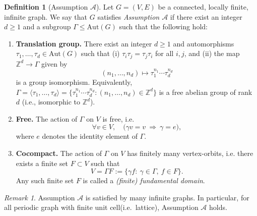 \documentclass[a4paper,11pt]{article}
\theoremstyle{plain}
\theoremstyle{definition}
\newtheorem{definition}[theorem]{Definition}
\theoremstyle{remark}
\newtheorem{remark}[theorem]{Remark}
\newcommand{\1}{\mathbf{1}}
\begin{document}
\begin{definition}[Assumption $\mathcal{A}$]\label{def:assumptionA}
Let $G=(V,E)$ be a connected, locally finite, infinite graph.
We say that $G$ satisfies \emph{Assumption $\mathcal{A}$} if there exist an integer $d\ge 1$
and a subgroup $\Gamma\le \mathrm{Aut}(G)$ such that the following hold:

\begin{enumerate}

\item \textbf{Translation group.}
There exist an integer $d\ge 1$ and automorphisms $\tau_1,\dots,\tau_d\in \mathrm{Aut}(G)$ such that
(i) $\tau_i\tau_j=\tau_j\tau_i$ for all $i,j$, and
(ii) the map $\mathbb{Z}^d\to\Gamma$ given by
\[
(n_1,\dots,n_d)\longmapsto \tau_1^{n_1}\cdots \tau_d^{n_d}
\]
is a group isomorphism. Equivalently, $\Gamma=\langle\tau_1,\dots,\tau_d\rangle=\{\tau_1^{n_1}\cdots\tau_d^{n_d}:(n_1,\dots,n_d)\in\mathbb{Z}^d\}$ is a free abelian group of rank $d$
(i.e., isomorphic to $\mathbb{Z}^d$).


\item \textbf{Free.}
The action of $\Gamma$ on $V$ is free, i.e.
\[
\forall v\in V,\quad \bigl(\gamma v = v \ \Rightarrow\  \gamma = e\bigr),
\]
where $e$ denotes the identity element of $\Gamma$.

\item \textbf{Cocompact.}
The action of $\Gamma$ on $V$ has finitely many vertex-orbits, i.e. there exists a finite set
$F\subset V$ such that
\[
V = \Gamma F := \{\gamma f:\ \gamma\in\Gamma,\ f\in F\}.
\]
Any such finite set $F$ is called a \emph{(finite) fundamental domain}.

\end{enumerate}
\end{definition}

\begin{remark}
Assumption $\mathcal{A}$ is satisfied by many infinite graphs. 
In particular, for all periodic graph with finite unit cell(i.e.~lattice), Assumption $\mathcal{A}$ holds.
\end{remark}
\end{document}
